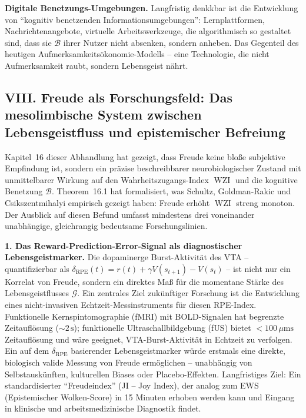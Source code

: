 ﻿\documentclass[12pt,a4paper]{report}
\theoremstyle{plain}
\theoremstyle{definition}
\theoremstyle{remark}
\DeclareMathOperator{\WZI}{WZI}
\begin{document}
	\textbf{Digitale Benetzungs-Umgebungen.}
	Langfristig denkkbar ist die Entwicklung von ``kognitiv benetzenden
	Informationsumgebungen'': Lernplattformen, Nachrichtenangebote,
	virtuelle Arbeitswerkzeuge, die algorithmisch so gestaltet sind,
	dass sie $\mathcal{B}$ ihrer Nutzer nicht absenken, sondern anheben.
	Das Gegenteil des heutigen Aufmerksamkeitsökonomie-Modells --
	eine Technologie, die nicht Aufmerksamkeit raubt, sondern
	Lebensgeist nährt.

	\subsection*{VIII. Freude als Forschungsfeld: Das mesolimbische System
		zwischen Lebensgeistfluss und epistemischer Befreiung}

	Kapitel~16 dieser Abhandlung hat gezeigt, dass Freude keine bloße
	subjektive Empfindung ist, sondern ein präzise beschreibbarer
	neurobiologischer Zustand mit unmittelbarer Wirkung auf den
	Wahrheitszugangs-Index $\WZI$ und die kognitive Benetzung $\mathcal{B}$.
	Theorem~16.1 hat formalisiert, was Schultz, Goldman-Rakic und
	Csikszentmihalyi empirisch gezeigt haben: Freude erhöht $\WZI$ streng monoton.
	Der Ausblick auf diesen Befund umfasst mindestens drei voneinander
	unabhängige, gleichrangig bedeutsame Forschungslinien.

	\textbf{1. Das Reward-Prediction-Error-Signal als diagnostischer Lebensgeistmarker.}
	Die dopaminerge Burst-Aktivität des VTA -- quantifizierbar als
	$\delta_{\mathrm{RPE}}(t) = r(t) + \gamma V(s_{t+1}) - V(s_t)$ --
	ist nicht nur ein Korrelat von Freude, sondern ein direktes
	Maß für die momentane Stärke des Lebensgeistflusses $\mathcal{G}$.
	Ein zentrales Ziel zukünftiger Forschung ist die Entwicklung eines
	nicht-invasiven Echtzeit-Messinstruments für diesen RPE-Index.
	Funktionelle Kernspintomographie (fMRI) mit BOLD-Signalen hat
	begrenzte Zeitauflösung ($\sim 2\,\mathrm{s}$); funktionelle
	Ultraschallbildgebung (fUS) bietet $< 100\,\mu\mathrm{ms}$
	Zeitauflösung und wäre geeignet, VTA-Burst-Aktivität in
	Echtzeit zu verfolgen.
	Ein auf dem $\delta_{\mathrm{RPE}}$ basierender Lebensgeistmarker
	würde erstmals eine direkte, biologisch valide Messung von Freude
	ermöglichen -- unabhängig von Selbstauskünften, kulturellen Biases
	oder Placebo-Effekten.
	Langfristiges Ziel: Ein standardisierter ``Freudeindex''
	(JI -- Joy Index), der analog zum EWS (Epistemischer Wolken-Score)
	in 15 Minuten erhoben werden kann und Eingang in klinische
	und arbeitsmedizinische Diagnostik findet.
\end{document}

